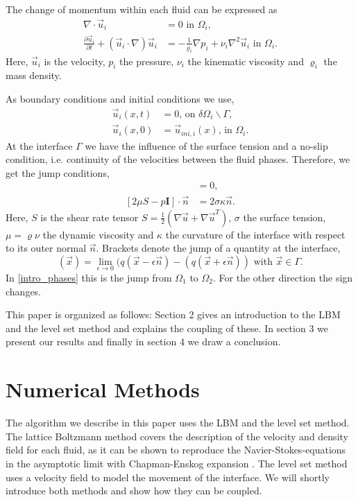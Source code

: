 \documentclass[final,leqno,onefignum,onetabnum]{siamltexmm}
\begin{document}
The change of momentum within each fluid can be expressed as
\begin{align}
  \nabla \cdot  \vec u_i &= 0 \text{  in } \Omega_i \text{,}
	\label{nse1} \\
	\frac{\partial \vec u_i}{\partial t} + \left(\vec  u_i\cdot \nabla \right) \vec u_i
  &=
	-\frac{1}{\varrho_i}\nabla p_i + \nu_i \nabla^2 \vec u_i \text{  in } \Omega_i \text{.}
	\label{nse2}
\end{align}
Here, $\vec u_i$ is the velocity, $p_i$ the pressure, $\nu_i$ the kinematic viscosity and $\varrho_i$ the mass density.

As boundary conditions and initial conditions we use,
\begin{align}
  \vec u_i(x,t) &= 0 \text{, on } \delta\Omega_i \backslash \Gamma \text{,} \\
  \vec u_i(x,0) &= \vec u_{ini,i}(x) \text{, in } \Omega_i \text{.}
\end{align}
At the interface $\Gamma$ we have the influence of the surface tension and a no-slip condition, i.e. continuity of the velocities between the fluid phases. Therefore, we get the jump conditions,
\begin{align}
  [\vec u] &= 0 \text{,  } \\
  [2\mu S - p \mathbf{I}] \cdot \vec n &= 2 \sigma \kappa \vec n \text{.}
	\label{jumpconditions}
\end{align}
Here, $S$ is the shear rate tensor $S=\frac12 \left( \nabla \vec u + \nabla {\vec u}^T\right)$, $\sigma$ the surface tension, $\mu = \varrho \nu$ the dynamic viscosity and $\kappa$ the curvature of the interface with respect to its outer normal $\vec n$. Brackets denote the jump of a quantity at the interface, 
\begin{equation}
	[q](\vec x) = \lim_{\epsilon \rightarrow 0} (q(\vec x - \epsilon \vec n) - (q(\vec x + \epsilon \vec n)) \text{ with } \vec x \in \Gamma. %
\end{equation}
In \cref{intro_phases} this is the jump from $\Omega_1$ to $\Omega_2$. For the other direction the sign changes.

This paper is organized as follows: Section 2 gives an introduction to the LBM and the level set method and explains the coupling of these. In section 3 we present our results and finally in section 4 we draw a conclusion.

\section{Numerical Methods}
The algorithm we describe in this paper uses the LBM and the level set method. The lattice Boltzmann method covers the description of the velocity and density field for each fluid, as it can be shown to reproduce the Navier-Stokes-equations in the asymptotic limit with Chapman-Enskog expansion \cite{LBM3}. The level set method uses a velocity field to model the movement of the interface. We will shortly introduce both methods and show how they can be coupled.
\end{document}
